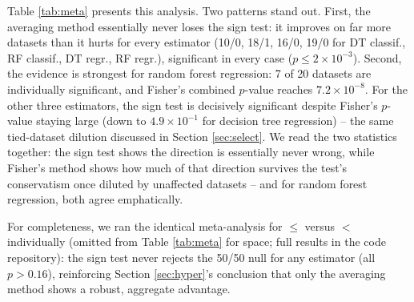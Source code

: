\documentclass[5p,twocolumn,authoryear]{elsarticle}
\theoremstyle{plain}%
\theoremstyle{remark}%
\theoremstyle{definition}%
\begin{document}
\begin{table}[tbp]
  \caption{Cross-dataset meta-analysis of the proposed averaging method against $\text{worst}(\leq,<)$, across the 20-dataset pool for each of the four estimator/problem type combinations. \emph{wins/losses} counts, among datasets with a nonzero mean score difference, how many favor the averaging method versus the reverse (datasets tied at exactly zero, see above, are excluded from this count but not from Fisher's combination); the sign-test $p$-value tests this split against the 50/50 null; Fisher $p$ combines all 20 datasets' corrected $p$-values (Section \ref{sec:tests-testing}) into a single statistic; $n_{sig}$ counts datasets individually significant under the corrected test alone. For $\leq$ vs.\ $<$ (not tabulated), the sign test never approaches significance for any estimator (all $p>0.16$), confirming, on real data, the same null result found under the idealized synthetic experiment of Section \ref{sec:synthetic}.}
  \label{tab:meta}
  \centering
    \begin{small}
      
    \end{small}
\end{table}

Table \ref{tab:meta} presents this analysis. Two patterns stand out. First, the averaging method essentially never loses the sign test: it improves on far more datasets than it hurts for every estimator (10/0, 18/1, 16/0, 19/0 for DT classif., RF classif., DT regr., RF regr.), significant in every case ($p \le 2\times10^{-3}$). Second, the evidence is strongest for random forest regression: 7 of 20 datasets are individually significant, and Fisher's combined $p$-value reaches $7.2\times10^{-8}$. For the other three estimators, the sign test is decisively significant despite Fisher's $p$-value staying large (down to $4.9\times10^{-1}$ for decision tree regression) -- the same tied-dataset dilution discussed in Section \ref{sec:select}. We read the two statistics together: the sign test shows the direction is essentially never wrong, while Fisher's method shows how much of that direction survives the test's conservatism once diluted by unaffected datasets -- and for random forest regression, both agree emphatically.

For completeness, we ran the identical meta-analysis for $\leq$ versus $<$ individually (omitted from Table \ref{tab:meta} for space; full results in the code repository): the sign test never rejects the 50/50 null for any estimator (all $p > 0.16$), reinforcing Section \ref{sec:hyper}'s conclusion that only the averaging method shows a robust, aggregate advantage.
\end{document}
